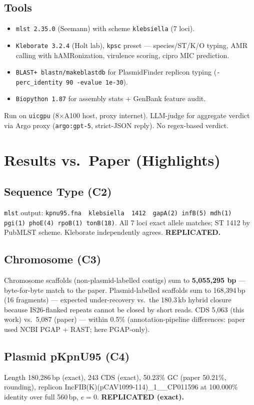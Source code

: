 \documentclass[11pt]{article}
\begin{document}
\subsection{Tools}
\begin{itemize}
  \item \texttt{mlst 2.35.0} (Seemann) with scheme \texttt{klebsiella} (7 loci).
  \item \texttt{Kleborate 3.2.4} (Holt lab), \texttt{kpsc} preset --- species/ST/K/O typing, AMR calling with hAMRonization, virulence scoring, cipro MIC prediction.
  \item \texttt{BLAST+ blastn/makeblastdb} for PlasmidFinder replicon typing (\texttt{-perc\_identity 90 -evalue 1e-30}).
  \item \texttt{Biopython 1.87} for assembly stats + GenBank feature audit.
\end{itemize}
Run on \texttt{uicgpu} (8$\times$A100 host, proxy internet). LLM-judge for aggregate verdict via Argo proxy (\texttt{argo:gpt-5}, strict-JSON reply). No regex-based verdict.

\section{Results vs.\ Paper (Highlights)}
\subsection{Sequence Type (C2)}
\texttt{mlst} output: \texttt{kpnu95.fna\ \ klebsiella\ \ 1412\ \ gapA(2) infB(5) mdh(1) pgi(1) phoE(4) rpoB(1) tonB(18)}. All 7 loci exact allele matches; ST 1412 by PubMLST scheme. Kleborate independently agrees. \textbf{REPLICATED.}

\subsection{Chromosome (C3)}
Chromosome scaffolds (non-plasmid-labelled contigs) sum to \textbf{5{,}055{,}295 bp} --- byte-for-byte match to the paper. Plasmid-labelled scaffolds sum to 168{,}394\,bp (16 fragments) --- expected under-recovery vs.\ the 180.3\,kb hybrid closure because IS26-flanked repeats cannot be closed by short reads. CDS 5{,}063 (this work) vs.\ 5{,}087 (paper) --- within 0.5\% (annotation-pipeline differences: paper used NCBI PGAP + RAST; here PGAP-only).

\subsection{Plasmid pKpnU95 (C4)}
Length 180{,}286\,bp (exact), 243 CDS (exact), 50.23\% GC (paper 50.21\%, rounding), replicon IncFIB(K)(pCAV1099-114)\_1\_\_CP011596 at 100.000\% identity over full 560\,bp, $e=0$. \textbf{REPLICATED (exact).}
\end{document}
